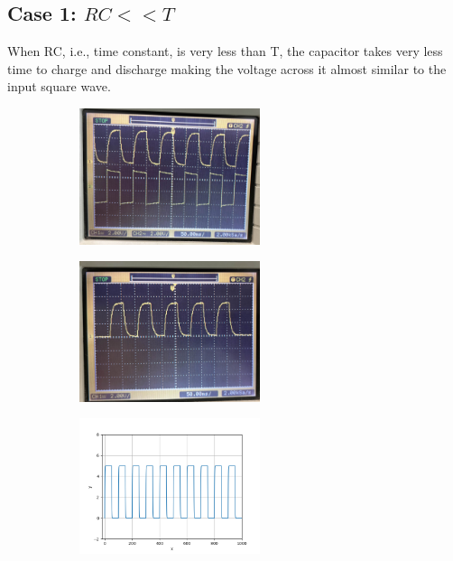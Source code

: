 \documentclass[a4paper,12pt]{article}
\begin{document}
\subsection*{Case 1: $RC << T$}
When RC, i.e., time constant, is very less than T, the capacitor takes very less time to charge and discharge making the voltage across it almost similar to the input square wave.
\begin{figure}[h!]
	\begin{subfigure}[b]{10pt}
	\includegraphics[width = 150pt]{figs/steady_1.jpg}
	\end{subfigure}
	\hspace{135pt}
	\begin{subfigure}[b]{10pt}
	\includegraphics[width = 150pt]{./figs/trans_1.jpg}
	\end{subfigure}
	\hspace{135pt}
	\begin{subfigure}[b]{10pt}
	\includegraphics[width = 150pt]{./figs/fig1.png}
	\end{subfigure}
\end{figure}
\end{document}
